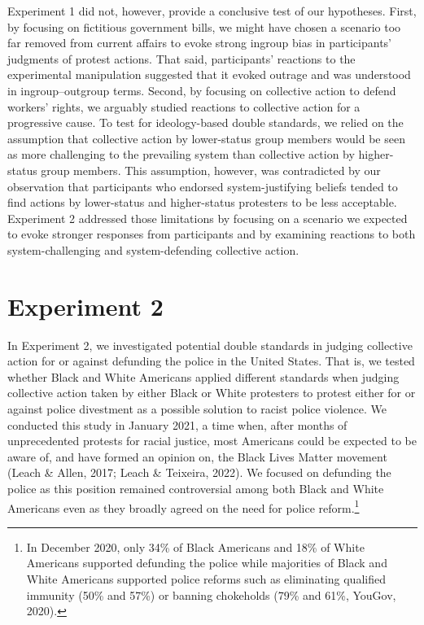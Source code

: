 \documentclass[12pt, letterpaper]{article}
\begin{document}
Experiment 1 did not, however, provide a conclusive test of our
hypotheses. First, by focusing on fictitious government bills, we might
have chosen a scenario too far removed from current affairs to evoke
strong ingroup bias in participants' judgments of protest actions. That
said, participants' reactions to the experimental manipulation suggested
that it evoked outrage and was understood in ingroup--outgroup terms.
Second, by focusing on collective action to defend workers' rights, we
arguably studied reactions to collective action for a progressive cause.
To test for ideology-based double standards, we relied on the assumption
that collective action by lower-status group members would be seen as
more challenging to the prevailing system than collective action by
higher-status group members. This assumption, however, was contradicted
by our observation that participants who endorsed system-justifying
beliefs tended to find actions by lower-status and higher-status
protesters to be less acceptable. Experiment 2 addressed those
limitations by focusing on a scenario we expected to evoke stronger
responses from participants and by examining reactions to both
system-challenging and system-defending collective action.

\hypertarget{experiment-2}{%
\section{Experiment 2}\label{experiment-2}}

In Experiment 2, we investigated potential double standards in judging
collective action for or against defunding the police in the United
States. That is, we tested whether Black and White Americans applied
different standards when judging collective action taken by either Black
or White protesters to protest either for or against police divestment
as a possible solution to racist police violence. We conducted this
study in January 2021, a time when, after months of unprecedented
protests for racial justice, most Americans could be expected to be
aware of, and have formed an opinion on, the Black Lives Matter movement
(Leach \& Allen, 2017; Leach \& Teixeira, 2022). We focused on defunding
the police as this position remained controversial among both Black and
White Americans even as they broadly agreed on the need for police
reform.\footnote{In December 2020, only 34\% of Black Americans and 18\%
  of White Americans supported defunding the police while majorities of
  Black and White Americans supported police reforms such as eliminating
  qualified immunity (50\% and 57\%) or banning chokeholds (79\% and
  61\%, YouGov, 2020).}
\end{document}
